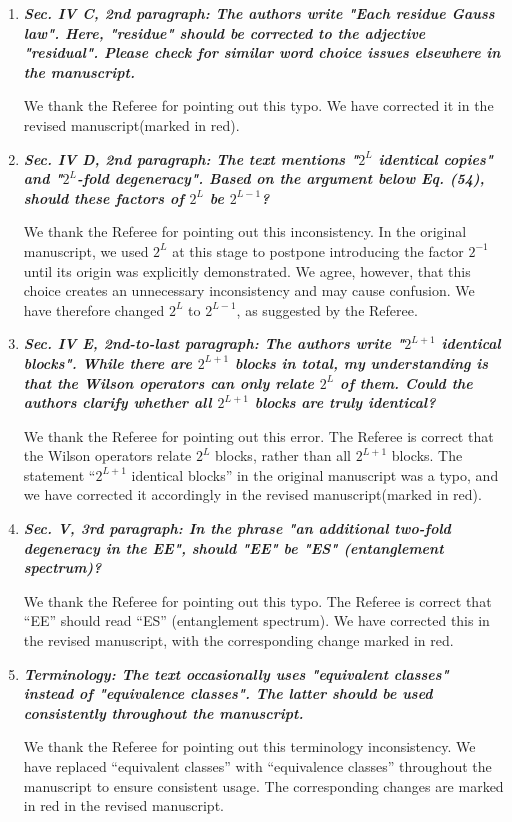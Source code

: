 \documentclass[12pt]{article}
\begin{document}
\begin{enumerate}
    \item \textbf{\textit{Sec. IV C, 2nd paragraph: The authors write "Each residue Gauss law". Here, "residue" should be corrected to the adjective "residual". Please check for similar word choice issues elsewhere in the manuscript.}}

    We thank the Referee for pointing out this typo. We have corrected it in the revised manuscript(marked in red).

    \item \textbf{\textit{Sec. IV D, 2nd paragraph: The text mentions "$2^L$ identical copies" and "$2^L$-fold degeneracy". Based on the argument below Eq. (54), should these factors of $2^L$ be $2^{L-1}$?}}

    We thank the Referee for pointing out this inconsistency. In the original manuscript, we used $2^L$ at this stage to postpone introducing the factor $2^{-1}$ until its origin was explicitly demonstrated. We agree, however, that this choice creates an unnecessary inconsistency and may cause confusion. We have therefore changed $2^L$ to $2^{L-1}$, as suggested by the Referee.

    \item \textbf{\textit{Sec. IV E, 2nd-to-last paragraph: The authors write "$2^{L+1}$ identical blocks". While there are $2^{L+1}$ blocks in total, my understanding is that the Wilson operators can only relate $2^L$ of them. Could the authors clarify whether all $2^{L+1}$ blocks are truly identical?}}

    We thank the Referee for pointing out this error. The Referee is correct that the Wilson operators relate $2^L$ blocks, rather than all $2^{L+1}$ blocks. The statement ``$2^{L+1}$ identical blocks'' in the original manuscript was a typo, and we have corrected it accordingly in the revised manuscript(marked in red).

    \item \textbf{\textit{Sec. V, 3rd paragraph: In the phrase "an additional two-fold degeneracy in the EE", should "EE" be "ES" (entanglement spectrum)?}}

    We thank the Referee for pointing out this typo. The Referee is correct that ``EE'' should read ``ES'' (entanglement spectrum). We have corrected this in the revised manuscript, with the corresponding change marked in red.

    \item \textbf{\textit{Terminology: The text occasionally uses "equivalent classes" instead of "equivalence classes". The latter should be used consistently throughout the manuscript.}}

    We thank the Referee for pointing out this terminology inconsistency. We have replaced ``equivalent classes'' with ``equivalence classes'' throughout the manuscript to ensure consistent usage. The corresponding changes are marked in red in the revised manuscript.
    
\end{enumerate}
\end{document}
